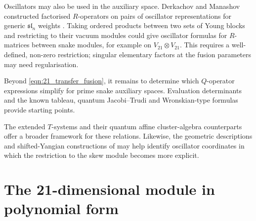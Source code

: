 \documentclass[12pt,reqno]{amsart}
\numberwithin{equation}{section}
\begin{document}
Oscillators may also be used in the auxiliary space.
Derkachov and Manashov constructed factorised $R$-operators
on pairs of oscillator representations for generic
$\mathfrak{sl}_n$ weights \cite{Derkachov:2008aq}.
Taking ordered products between two sets of Young blocks and
restricting to their vacuum modules could give oscillator formulas
for $R$-matrices between snake modules, for example on
$V_{21}\otimes V_{21}$. This requires a well-defined, non-zero
restriction; singular elementary factors at the fusion parameters
may need regularisation.

Beyond \eqref{eqn:21_transfer_fusion}, it remains to determine
which $Q$-operator expressions simplify for prime snake auxiliary
spaces. Evaluation determinants \cite[Eq.~(5.10)]{BFLMS} and the
known tableau, quantum Jacobi--Trudi and Wronskian-type formulas
\cite{Tsuboi1997,Tsuboi2010,LuMukhin2021} provide starting points.

The extended $T$-systems \cite{MY} and their quantum affine
cluster-algebra counterparts \cite{DuanLiLuo2019} offer a broader
framework for these relations. Likewise, the geometric descriptions
and shifted-Yangian constructions of \cite{Frassek:2018try,Frassek:2020lky}
may help identify oscillator coordinates in which the restriction
to the skew module becomes more explicit.


	\clearpage
	\appendix
	\section{The 21-dimensional module in polynomial form}
	\label{app:21dim_module}
\end{document}
